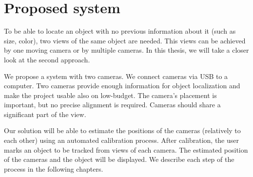 \chapter{Proposed system}

To be able to locate an object with no previous information about it (such as
size, color), two views of the same object are needed. This views can be
achieved by one moving camera or by multiple cameras. In this thesis, we will
take a closer look at the second approach.

We propose a system with two cameras. We connect cameras via USB to a computer.
Two cameras provide enough information for object localization and make the
project usable also on low-budget. The camera's placement is important, but no
precise alignment is required. Cameras should share a significant part of the
view.


Our solution will be able to estimate the positions of the cameras (relatively
to each other) using an automated calibration process. After calibration, the
user marks an object to be tracked from views of each camera. The estimated
position of the cameras and the object will be displayed. We describe each step
of the process in the following chapters.
